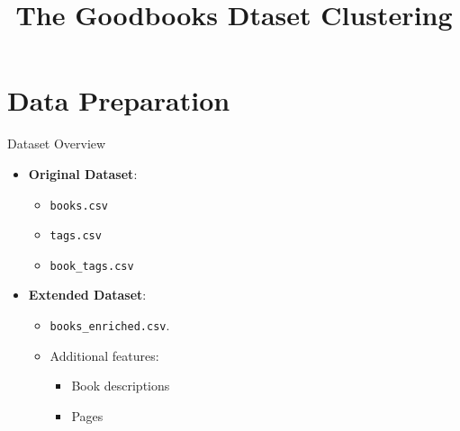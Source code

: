 \documentclass{beamer}
\title{The Goodbooks Dtaset Clustering}
\author[\FirstName \space \LastName]
{\FirstName{} \LastName}
\begin{document}
\frame{\titlepage}


\section{Data Preparation}
\begin{frame}{Dataset Overview}
    \begin{itemize}
        \item \textbf{Original Dataset}:
            \begin{itemize}
                \item \texttt{books.csv}
                \item \texttt{tags.csv}
                \item \texttt{book\_tags.csv}
            \end{itemize}
        \item \textbf{Extended Dataset}:
            \begin{itemize}
                \item \texttt{books\_enriched.csv}.
                \item Additional features:
                \begin{itemize}
                    \item Book descriptions
                    \item Pages
                \end{itemize}
            \end{itemize}
    \end{itemize}
\end{frame}
\end{document}
